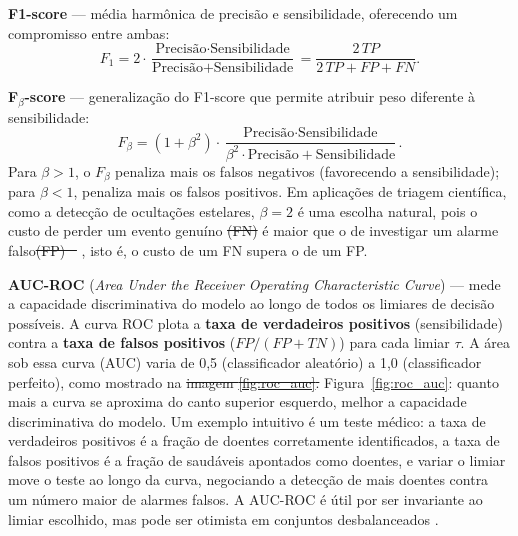 \documentclass[msc]{on} %
\makeatletter
\providecommand{\DIFaddtex}[1]{{\protect\color{red}#1}} %
\providecommand{\DIFdeltex}[1]{{\protect\color{red}\sout{#1}}} %
\providecommand{\DIFaddbegin}{} %
\providecommand{\DIFaddend}{} %
\providecommand{\DIFdelbegin}{} %
\providecommand{\DIFdelend}{} %
\providecommand{\DIFadd}[1]{\texorpdfstring{\DIFaddtex{#1}}{#1}} %
\providecommand{\DIFdel}[1]{\texorpdfstring{\DIFdeltex{#1}}{}} %
\let\sout@orig\sout %
\renewcommand{\sout}[1]{\ifmmode\text{\sout@orig{\ensuremath{#1}}}\else\sout@orig{#1}\fi} %
\makeatother
\begin{document}
\textbf{F1-score} --- média harmônica de precisão e sensibilidade, oferecendo um compromisso entre ambas:
\begin{equation}
F_1 = 2 \cdot \frac{\text{Precisão} \cdot \text{Sensibilidade}}{\text{Precisão} + \text{Sensibilidade}} = \frac{2\,TP}{2\,TP + FP + FN}.
\end{equation}

\textbf{F$_\beta$-score} --- generalização do F1-score que permite atribuir peso diferente à sensibilidade:
\begin{equation}
F_\beta = (1 + \beta^2) \cdot \frac{\text{Precisão} \cdot \text{Sensibilidade}}{\beta^2 \cdot \text{Precisão} + \text{Sensibilidade}}.
\end{equation}
Para $\beta > 1$, o $F_\beta$ penaliza mais os falsos negativos (favorecendo a sensibilidade); para $\beta < 1$, penaliza mais os falsos positivos. Em aplicações de triagem científica, como a detecção de ocultações estelares, $\beta = 2$ é uma escolha natural, pois o custo de perder um evento genuíno \DIFdelbegin \DIFdel{(FN) }\DIFdelend é maior que o de investigar um alarme falso\DIFdelbegin \DIFdel{(FP) \mbox{%
\citep{Saito2015}}\hskip0pt%
}\DIFdelend\ifhmode\hskip0pt\fi \DIFaddbegin \DIFadd{, isto é, o custo de um FN supera o de um FP}\DIFaddend .

\textbf{AUC-ROC} (\textit{Area Under the Receiver Operating Characteristic Curve}) --- mede a capacidade discriminativa do modelo ao longo de todos os limiares de decisão possíveis. A curva ROC plota a \textbf{taxa de verdadeiros positivos} (sensibilidade) contra a \textbf{taxa de falsos positivos} ($FP/(FP+TN)$) para cada limiar $\tau$. A área sob essa curva (AUC) varia de 0,5 (classificador aleatório) a 1,0 (classificador perfeito), como mostrado na \DIFdelbegin \DIFdel{imagem \ref{fig:roc_auc}. }\DIFdelend\ifhmode\hskip0pt\fi \DIFaddbegin \DIFadd{Figura~\ref{fig:roc_auc}: quanto mais a curva se aproxima do canto superior esquerdo, melhor a capacidade discriminativa do modelo. Um exemplo intuitivo é um teste médico: a taxa de verdadeiros positivos é a fração de doentes corretamente identificados, a taxa de falsos positivos é a fração de saudáveis apontados como doentes, e variar o limiar move o teste ao longo da curva, negociando a detecção de mais doentes contra um número maior de alarmes falsos. }\DIFaddend A AUC-ROC é útil por ser invariante ao limiar escolhido, mas pode ser otimista em conjuntos desbalanceados \citep{Saito2015}.
\end{document}
